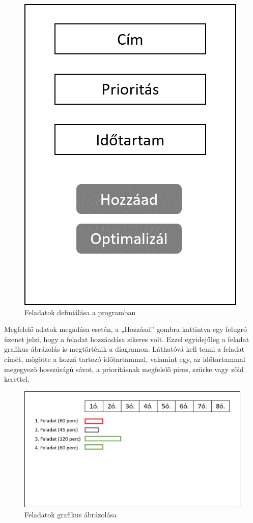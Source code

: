\begin{figure}[h]
	\centering
	\includegraphics[scale=0.6]{images/addTasks.png}
	\caption{Feladatok definiálása a programban}
	\label{fig:addTasks}
\end{figure}

Megfelelő adatok megadása esetén, a „Hozzáad” gombra kattintva egy felugró üzenet jelzi, hogy a feladat hozzáadása sikeres volt. Ezzel egyidejűleg a feladat grafikus ábrázolás is megtörténik a diagramon. Láthatóvá kell tenni a feladat címét, mögötte a hozzá tartozó időtartammal, valamint egy, az időtartammal megegyező hosszúságú sávot, a prioritásnak megfelelő piros, szürke vagy zöld kerettel.


\begin{figure}[h]
	\centering
	\includegraphics[scale=0.7]{images/diagram.png}
	\caption{Feladatok grafikus ábrázolása}
	\label{fig:diagram}
\end{figure}

